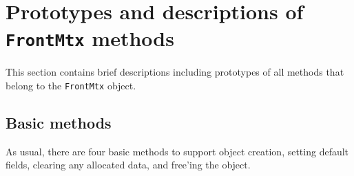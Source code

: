 \par
\section{Prototypes and descriptions of {\tt FrontMtx} methods}
\label{section:FrontMtx:proto}
\par
This section contains brief descriptions including prototypes
of all methods that belong to the {\tt FrontMtx} object.
\par
\subsection{Basic methods}
\label{subsection:FrontMtx:proto:basics}
\par
As usual, there are four basic methods to support object creation,
setting default fields, clearing any allocated data, and free'ing
the object.
\par
